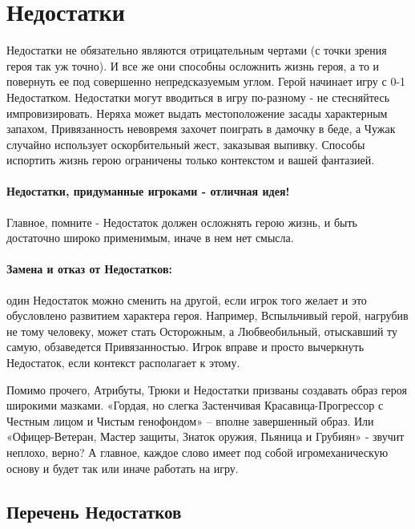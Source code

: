 \section{Недостатки}
Недостатки не обязательно являются отрицательным чертами (с точки зрения героя так уж точно). И все же они способны осложнить жизнь героя, а то и повернуть ее под совершенно непредсказуемым углом. Герой начинает игру с 0-1 Недостатком.
\newline Недостатки могут вводиться в игру по-разному - не стесняйтесь импровизировать. Неряха может выдать местоположение засады характерным запахом, Привязанность невовремя захочет поиграть в дамочку в беде, а Чужак случайно использует оскорбительный жест, заказывая выпивку. Способы испортить жизнь герою ограничены только контекстом и вашей фантазией.
\paragraph{Недостатки, придуманные игроками - отличная идея!} Главное, помните - Недостаток должен осложнять герою жизнь, и быть достаточно широко применимым, иначе в нем нет смысла.
\paragraph{Замена и отказ от Недостатков:} один Недостаток можно сменить на другой, если игрок того желает и это обусловлено развитием характера героя. Например, Вспыльчивый герой, нагрубив не тому человеку, может стать Осторожным, а Любвеобильный, отыскавший ту самую, обзаведется Привязанностью. Игрок вправе и просто вычеркнуть Недостаток, если контекст располагает к этому.
\begin{tcolorbox}
    Помимо прочего, Атрибуты, Трюки и Недостатки призваны создавать образ героя широкими мазками. «Гордая, но слегка Застенчивая Красавица-Прогрессор с Честным лицом и Чистым генофондом» – вполне завершенный образ. Или «Офицер-Ветеран, Мастер защиты, Знаток оружия, Пьяница и Грубиян» - звучит неплохо, верно? А главное, каждое слово имеет под собой игромеханическую основу и будет так или иначе работать на игру.
\end{tcolorbox}
\subsection{Перечень Недостатков}
